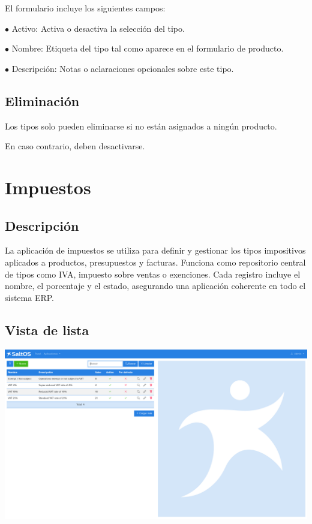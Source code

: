 \documentclass[a4paper]{article}
\begin{document}
El formulario incluye los siguientes campos:

\begin{compactitem}
\item[\color{myblue}$\bullet$] Activo: Activa o desactiva la selección del tipo.
\item[\color{myblue}$\bullet$] Nombre: Etiqueta del tipo tal como aparece en el formulario de producto.
\item[\color{myblue}$\bullet$] Descripción: Notas o aclaraciones opcionales sobre este tipo.
\end{compactitem}

\hypertarget{toc165}{}
\subsection{Eliminación}

Los tipos solo pueden eliminarse si no están asignados a ningún producto.

En caso contrario, deben desactivarse.


\hypertarget{toc166}{}
\section{Impuestos}

\hypertarget{toc167}{}
\subsection{Descripción}

La aplicación de impuestos se utiliza para definir y gestionar los tipos impositivos aplicados a productos, presupuestos y facturas.
Funciona como repositorio central de tipos como IVA, impuesto sobre ventas o exenciones.
Cada registro incluye el nombre, el porcentaje y el estado, asegurando una aplicación coherente en todo el sistema ERP.

\hypertarget{toc168}{}
\subsection{Vista de lista}

\begin{center}\includegraphics[width=1\textwidth]{../ujest/snaps/test-screenshots-js-screenshots-sales-taxes-list-es-es-1-snap.png}\end{center}
\end{document}
